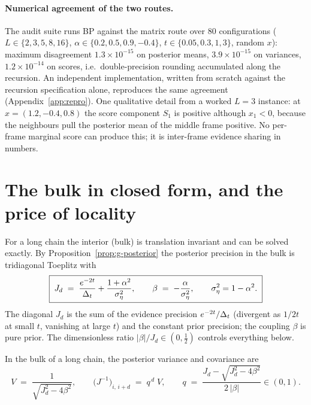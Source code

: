 \paragraph{Numerical agreement of the two routes.} The audit suite runs BP
against the matrix route over $80$ configurations
($L \in \{2,3,5,8,16\}$, $\alpha \in \{0.2, 0.5, 0.9, -0.4\}$,
$t \in \{0.05, 0.3, 1, 3\}$, random $x$): maximum disagreement
$1.3 \times 10^{-15}$ on posterior means, $3.9 \times 10^{-15}$ on
variances, $1.2 \times 10^{-14}$ on scores, i.e.\ double-precision
rounding accumulated along the recursion. An independent implementation,
written from scratch against the recursion specification alone,
reproduces the same agreement (Appendix~\ref{app:repro}). One qualitative
detail from a worked $L = 3$ instance: at $x = (1.2, -0.4, 0.8)$ the score
component $S_1$ is positive although $x_1 < 0$, because the neighbours
pull the posterior mean of the middle frame positive. No per-frame
marginal score can produce this; it is inter-frame evidence sharing in
numbers.

\section{The bulk in closed form, and the price of locality}
\label{sec:g-bulk}\label{sec:g-locality}\label{sec:bp-truncation}

For a long chain the interior (bulk) is translation invariant and can be
solved exactly. By Proposition~\ref{prop:g-posterior} the posterior
precision in the bulk is tridiagonal Toeplitz with
\begin{equation}
  \boxed{\;
  J_d \;=\; \frac{e^{-2t}}{\Delta_t} + \frac{1+\alpha^2}{\sigma_\eta^2},
  \qquad
  \beta \;=\; -\frac{\alpha}{\sigma_\eta^2},
  \qquad \sigma_\eta^2 = 1 - \alpha^2 .
  \;}
  \label{eq:g-bulk-params}
\end{equation}
The diagonal $J_d$ is the sum of the evidence precision $e^{-2t}/\Delta_t$
(divergent as $1/2t$ at small $t$, vanishing at large $t$) and the
constant prior precision; the coupling $\beta$ is pure prior. The
dimensionless ratio $|\beta|/J_d \in (0, \tfrac{1}{2})$ controls
everything below.

\begin{theorem}
\label{thm:g-bulk-cov}
In the bulk of a long chain, the posterior variance and covariance are
\begin{equation}
  \boxed{\;
  V \;=\; \frac{1}{\sqrt{J_d^2 - 4\beta^2}},
  \qquad
  \big( J^{-1} \big)_{i,\, i+d} \;=\; q^{\,d}\; V,
  \qquad
  q \;=\; \frac{J_d - \sqrt{J_d^2 - 4\beta^2}}{2\,|\beta|} \in (0, 1).
  \;}
  \label{eq:g-bulk-cov}
\end{equation}
\end{theorem}

